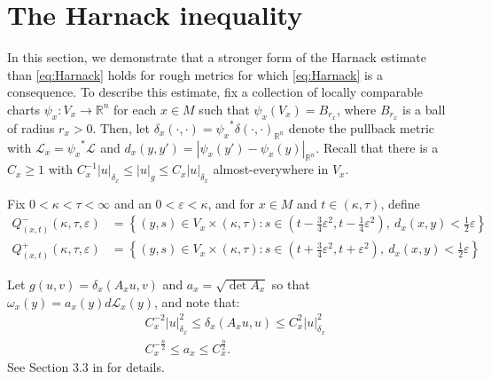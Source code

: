 \documentclass[a4paper, 12pt]{amsart}
\numberwithin{equation}{section}
\renewcommand{\~}{\tilde}
\renewcommand{\-}{\bar}
\newcommand{\R}{\mathbb{R}}
\newcommand{\8}{\infty}
\newcommand{\cbrac}[1]{\left(#1\right)}
\newcommand{\dbrac}[1]{\left\{#1\right\}}
\newcommand{\modulus}[1]{|#1|}
\newcommand{\set}[1]{\dbrac{#1}}
\newcommand{\script}[1]{\mathscr{#1}}
\renewcommand{\epsilon}{\varepsilon}
\newcommand{\pullb}[1]{{#1}^\ast}			%
\newcommand{\Leb}[1][{}]{\script{L}^{#1}}			%
\begin{document}
\section{The Harnack inequality}
\label{sec:harnack}

In this section, we demonstrate that a
stronger form of the  Harnack 
estimate than \eqref{eq:Harnack} holds for rough 
metrics for which  \eqref{eq:Harnack} is a consequence.
To describe this estimate, fix a collection of 
locally comparable charts $\psi_x:V_x \to \R^n$ 
for each $x \in M$ such that $\psi_x(V_x) = B_{r_x}$,
where $B_{r_x}$ is a ball of radius $r_x > 0$. 
Then, let
$\delta_x(\cdot, \cdot) = \pullb{\psi_x}\delta(\cdot, \cdot)_{\R^n}$
denote the pullback metric with $\Leb_x = \pullb{\psi_x}\Leb$
and $d_x(y,y') = \modulus{\psi_x(y') - \psi_x(y)}_{\R^n}$.
Recall that there is a $C_x \geq 1$
with $C_x^{-1}  \modulus{u}_{\delta_x} \leq \modulus{u}_g \leq C_x \modulus{u}_{\delta_x}$
almost-everywhere in $V_x$.

Fix $0 < \kappa < \tau < \infty$ and an $0 < \epsilon < \kappa$,
and for $x \in M$ and $t \in (\kappa, \tau)$, define
\begin{equation}
\label{eq:paradef}
\begin{split} 
Q^-_{(x,t)}(\kappa, \tau, \epsilon) &= \set{(y,s) \in V_x \times (\kappa,\tau): s \in \cbrac{t - \frac{3}{4}\epsilon^2, t - \frac{1}{4} \epsilon^2},\ 
	d_x(x,y) < \frac{1}{2} \epsilon} \\
Q^+_{(x,t)}(\kappa, \tau, \epsilon) &= \set{(y,s) \in V_x \times (\kappa,\tau): s \in \cbrac{t + \frac{3}{4}\epsilon^2, t + \epsilon^2},\ 
	d_x(x,y) < \frac{1}{2} \epsilon}
\end{split}
\end{equation}

Let $g(u,v) = \delta_x(A_x u,v)$
and $a_x = \sqrt{\det A_x}$ so that
$\omega_x(y) = a_x(y)d\Leb_x(y)$, and note
that:
\begin{equation}
\label{eq:constbd}
\begin{split}
&C_x^{-2} \modulus{u}_{\delta_x}^2 \leq \delta_x(A_x u, u) \leq C_x^2 \modulus{u}_{\delta_x}^2 \\
&C_x^{-\frac{n}{2}} \leq a_x \leq C_x^{\frac{n}{2}}.
\end{split}
\end{equation}
See Section 3.3 in \cite{BRough} for details. 
\end{document}
